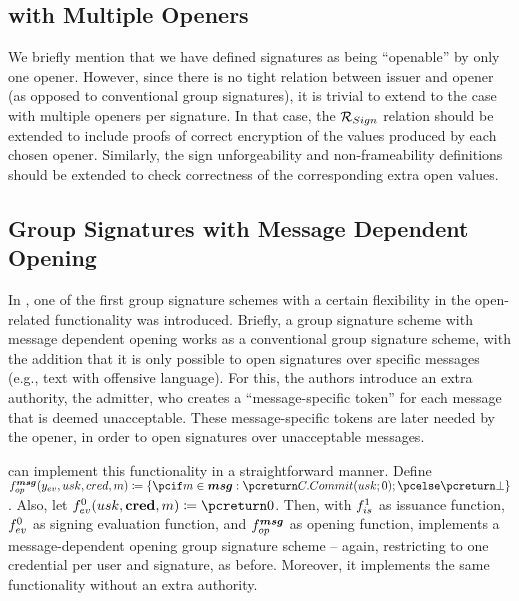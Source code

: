 \subsection{\UAS with Multiple Openers}
We briefly mention that we have defined \UAS signatures as being ``openable'' by
only one opener. However, since there is no tight relation between issuer and
opener (as opposed to conventional group signatures), it is trivial to
extend to the case with multiple openers per signature. In that case, the
$\mathcal{R}_{Sign}$ relation should be extended to include proofs of correct
encryption of the \yinsp values produced by each chosen opener.
Similarly, the sign unforgeability and non-frameability definitions should be
extended to check correctness of the corresponding extra open values.

\subsection{Group Signatures with Message Dependent Opening}

In \cite{khk+19}, one of the first group signature schemes with a certain
flexibility in the open-related functionality was introduced. Briefly, a group
signature scheme with message dependent opening works as a conventional group
signature scheme, with the addition that it is only possible to open signatures
over specific messages (e.g., text with offensive language). For this, the
authors introduce an extra authority, the admitter, who creates a
``message-specific token'' for each message that is deemed unacceptable.
These message-specific tokens are later needed by the opener, in order to open
signatures over unacceptable messages.

\UAS can implement this functionality in a straightforward manner. Define
$\finsp^{\smsg}(\yeval,\usk,\cred,\msg) \coloneqq \lbrace \pcif \msg \in \smsg:
\pcreturn \CCommit(\usk;0); \pcelse \pcreturn \bot \rbrace$. Also, let
$\feval^0(\usk,\scred,\msg) \coloneqq \pcreturn 0$. Then, \UAS with $f_{is}^1$
as issuance function, $f_{ev}^0$ as signing evaluation function, and
$f_{op}^{\boldsymbol{msg}}$ as opening function, implements a message-dependent opening
group signature scheme -- again, restricting to one credential per user and
signature, as before. Moreover, it implements the same functionality without
an extra authority.


